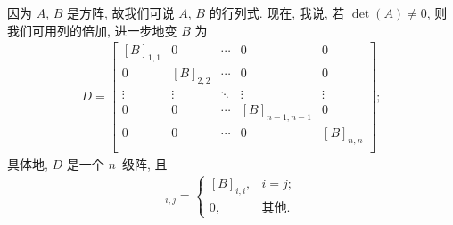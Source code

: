 因为 \(A\), \(B\) 是方阵,
故我们可说 \(A\), \(B\) 的行列式.
现在, 我说, 若 \(\det {(A)} \neq 0\),
则我们可用列的倍加, 进一步地变 \(B\) 为
\begin{align*}
    D =
    \begin{bmatrix}
        [B]_{1,1} & 0         & \cdots & 0             & 0         \\
        0         & [B]_{2,2} & \cdots & 0             & 0         \\
        \vdots    & \vdots    & \ddots & \vdots        & \vdots    \\
        0         & 0         & \cdots & [B]_{n-1,n-1} & 0         \\
        0         & 0         & \cdots & 0             & [B]_{n,n} \\
    \end{bmatrix};
\end{align*}
具体地, \(D\) 是一个 \(n\)~级阵,
且
\begin{align*}
    [D]_{i,j} =
    \begin{cases}
        [B]_{i,i}, & i = j;     \\
        0,         & \text{其他}.
    \end{cases}
\end{align*}

